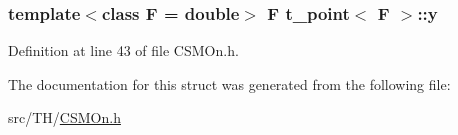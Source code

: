 \subsubsection[{\texorpdfstring{y}{y}}]{\setlength{\rightskip}{0pt plus 5cm}template$<$class F  = double$>$ F {\bf t\+\_\+point}$<$ F $>$\+::y}\hypertarget{structt__point_a17c8b258b76ba9d626ff9ddcdd7900e0}{}\label{structt__point_a17c8b258b76ba9d626ff9ddcdd7900e0}


Definition at line 43 of file C\+S\+M\+On.\+h.



The documentation for this struct was generated from the following file\+:\begin{DoxyCompactItemize}
\item 
src/\+T\+H/\hyperlink{CSMOn_8h}{C\+S\+M\+On.\+h}\end{DoxyCompactItemize}

